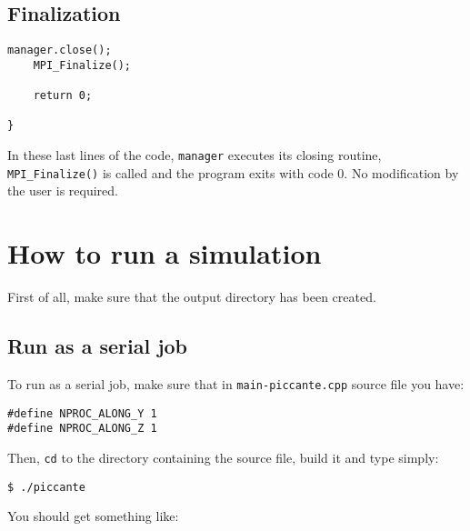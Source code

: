 \documentclass[11pt,a4paper]{report}
\begin{document}
\section{Finalization}
\begin{lstlisting}[backgroundcolor=\color{no_modify}]
	manager.close();
	MPI_Finalize();

	return 0;

}
\end{lstlisting}
In these last lines of the code, \verb+manager+ executes its closing routine, \verb+MPI_Finalize()+ is called and the program exits with code 0. No modification by the user is required.



\chapter{How to run a simulation}\label{chapter_run}
First of all, make sure that the output directory has been created.
\section{Run as a serial job}
To run as a serial job, make sure that in \verb+main-piccante.cpp+ source file you have:
\begin{lstlisting}
#define NPROC_ALONG_Y 1
#define NPROC_ALONG_Z 1
\end{lstlisting}
Then, \verb+cd+ to the directory containing the source file, build it and type simply:
\begin{verbatim}
$ ./piccante
\end{verbatim}
You should get something like:
\end{document}
